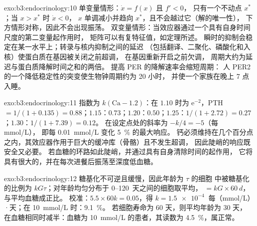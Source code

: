 \begin{solution}{exo:b3:endocrinology:10}
单变量情形：$\dot x = f(x)$ 且 $f' < 0$，
只有一个不动点 $x^{*}$；当 $x > x^{*}$ 时 $\dot x < 0$，
$x$ 单调减小并趋向 $x^{*}$，且不会越过它（解的唯一性），
下方情形对称，因此不会出现振荡。
双变量情形：当效应器通过一个具有自身时间尺度的第二变量起作用时，
矩阵可以有复特征值，如定理所述。
瞬时的抑制会稳定在某一水平上；转录与核内抑制之间的延迟
（包括翻译、二聚化、磷酸化和入核）使蛋白质在基因被关闭之前超调，
在基因重新开启之前欠调，
周期大约为延迟与蛋白质降解时间之和的两倍。
提高 PER 的降解速率会缩短周期：
人 PER2 的一个降低稳定性的突变使生物钟周期约为 20 小时，
并使一个家族在晚上 7 点入睡。
\end{solution}

\begin{solution}{exo:b3:endocrinology:11}
指数为 $k(\text{Ca} - 1.2)$：在 $1.10$ 时为 $\mathrm{e}^{-2}$，PTH $= 1/
(1 + 0.135) = 0.88$；$1.15$：$0.73$；$1.20$：$0.50$；$1.25$：$1/(1 +
2.72) = 0.27$；$1.30$：$1/(1 + 7.39) = 0.12$。
在设定点处的斜率为 $-k/4 = -5$（每 mmol/L），
即每 \qty{0.01}{mmol/L} 变化 \qty{5}{\%} 的最大响应。
钙必须维持在几个百分点之内，其效应器作用于巨大的缓冲库（骨骼）且不发生超调，
因此陡峭的响应既安全又必要。
若血糖的环路如此陡峭，并通过具有自身清除时间的起作用，
它将具有很大的，并在每次进餐后振荡至深度低血糖。
\end{solution}

\begin{solution}{exo:b3:endocrinology:12}
糖基化不可逆且缓慢，因此年龄为 $\tau$ 的细胞
中被糖基化的比例为 $kG\tau$；对年龄均匀分布于
\numrange{0}{120}~天之间的细胞取平均， $= kG\times\qty{60}{d}$，与平均血糖成正比。
校准：$5.5\times 60k = 0.05$，得 $k =
\qty{1.5e-4}{}$ 每（mmol/L）·天；在 \qty{10}{mmol/L} 时：\qty{9.1}{\%}。
若细胞寿命为 60 天，则平均年龄为 30 天，
在血糖相同时减半：血糖为 \qty{10}{mmol/L} 的患者，其读数为
\qty{4.5}{\%}，属正常。
\end{solution}

